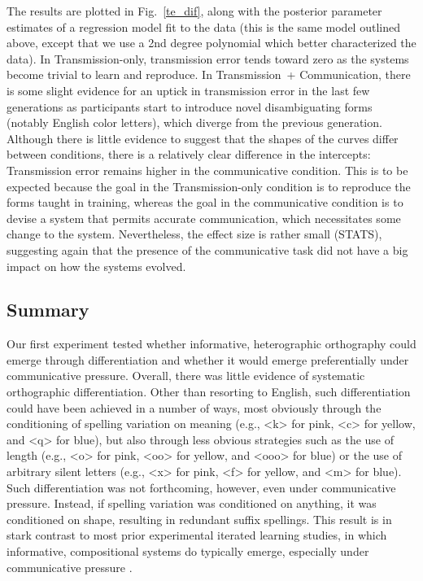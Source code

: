 \documentclass[doc,biblatex]{apa7}
\begin{document}
The results are plotted in Fig.~\ref{te_dif}, along with the posterior parameter estimates of a regression model fit to the data (this is the same model outlined above, except that we use a 2nd degree polynomial which better characterized the data). In Transmission-only, transmission error tends toward zero as the systems become trivial to learn and reproduce. In Transmission~+ Communication, there is some slight evidence for an uptick in transmission error in the last few generations as participants start to introduce novel disambiguating forms (notably English color letters), which diverge from the previous generation. Although there is little evidence to suggest that the shapes of the curves differ between conditions, there is a relatively clear difference in the intercepts: Transmission error remains higher in the communicative condition. This is to be expected because the goal in the Transmission-only condition is to reproduce the forms taught in training, whereas the goal in the communicative condition is to devise a system that permits accurate communication, which necessitates some change to the system. Nevertheless, the effect size is rather small (STATS), suggesting again that the presence of the communicative task did not have a big impact on how the systems evolved.

\subsection{Summary}

Our first experiment tested whether informative, heterographic orthography could emerge through differentiation and whether it would emerge preferentially under communicative pressure. Overall, there was little evidence of systematic orthographic differentiation. Other than resorting to English, such differentiation could have been achieved in a number of ways, most obviously through the conditioning of spelling variation on meaning (e.g., <k> for pink, <c> for yellow, and <q> for blue), but also through less obvious strategies such as the use of length (e.g., <o> for pink, <oo> for yellow, and <ooo> for blue) or the use of arbitrary silent letters (e.g., <x> for pink, <f> for yellow, and <m> for blue). Such differentiation was not forthcoming, however, even under communicative pressure. Instead, if spelling variation was conditioned on anything, it was conditioned on shape, resulting in redundant suffix spellings. This result is in stark contrast to most prior experimental iterated learning studies, in which informative, compositional systems do typically emerge, especially under communicative pressure \parencite[e.g.,][]{Kirby:2015}.
\end{document}
